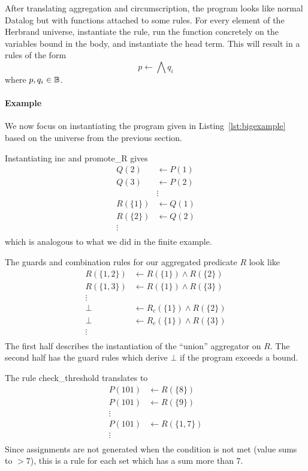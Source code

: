 After translating aggregation and circumscription, the program looks like normal Datalog but with functions attached to some rules.
For every element of the Herbrand universe, instantiate the rule, run the function concretely on the variables bound in the body, and instantiate the head term.
This will result in a rules of the form
\[
	p \leftarrow \bigwedge q_i
\]
where $p, q_i \in \mathbb{B}$.

\paragraph{Example}
We now focus on instantiating the program given in Listing~\ref{lst:bigexample} based on the universe from the previous section.

Instantiating inc and promote_R gives
\begin{align*}
	Q(2) &\leftarrow P(1)\\
	Q(3) &\leftarrow P(2)\\
	&\vdots\\
	R(\{1\}) &\leftarrow Q(1)\\
	R(\{2\}) &\leftarrow Q(2)\\
	\vdots\\
\end{align*}
which is analogous to what we did in the finite example.

The guards and combination rules for our aggregated predicate $R$ look like
\begin{align*}
	R(\{1, 2\}) &\leftarrow R(\{1\}) \wedge R(\{2\})\\
	R(\{1, 3\}) &\leftarrow R(\{1\}) \wedge R(\{3\})\\
	\vdots\\
	\bot &\leftarrow R_c(\{1\}) \wedge R(\{2\})\\
	\bot &\leftarrow R_c(\{1\}) \wedge R(\{3\})\\
	\vdots\\
\end{align*}
The first half describes the instantiation of the ``union'' aggregator on $R$.
The second half has the guard rules which derive $\bot$ if the program exceeds a bound.

The rule check\_threshold translates to
\begin{align*}
	P(101) &\leftarrow R(\{8\})\\
	P(101) &\leftarrow R(\{9\})\\
	\vdots\\
	P(101) &\leftarrow R(\{1, 7\})\\
	\vdots\\
\end{align*}
Since assignments are not generated when the condition is not met (value sums to $> 7$), this is a rule for each set which has a sum more than 7.

